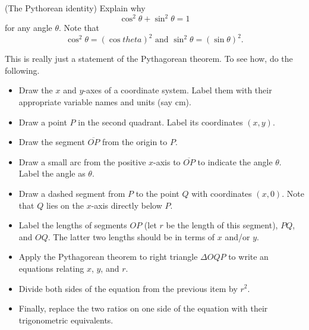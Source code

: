 \documentclass{ximera}
\begin{document}
\begin{question} \label{Q234234hg:Cosine}
(The Pythorean identity) Explain why
\[
  \cos^2\theta + \sin^2 \theta = 1
\]
for any angle $\theta$. Note that 
\[
   \cos^2\theta = (\cos theta)^2  \text{ and } \sin^2\theta = (\sin\theta)^2 .
\]

\begin{explanation}
This is really just a statement of the Pythagorean theorem. To see how, do the following.
\begin{itemize}

\item{Draw the $x$ and $y$-axes of a coordinate system. Label them with their appropriate variable names and units (say cm).}

\item{Draw a point $P$ in the second quadrant. Label its coordinates $(x,y)$.}

\item{Draw the segment $\overline{OP}$ from the origin to $P$.}

\item{Draw a small arc from the positive $x$-axis to $\overline{OP}$ to indicate the angle $\theta$. Label the angle as $\theta$.}

\item{Draw a dashed segment from $P$ to the point $Q$ with coordinates $(x,0)$. Note that $Q$ lies on the $x$-axis directly below $P$.}

\item{Label the lengths of segments $OP$ (let $r$ be the length of this segment), $PQ$, and $OQ$. The latter two lengths should be in terms of $x$ and/or $y$.}

\item{Apply the Pythagorean theorem to right triangle $\Delta OQP$ to write an equations relating $x$, $y$, and $r$.}

\item{Divide both sides of the equation from the previous item by $r^2$.}

\item{Finally, replace the two ratios on one side of the equation with their trigonometric equivalents.}



\end{itemize}
\end{explanation}

\end{question}
\end{document}
